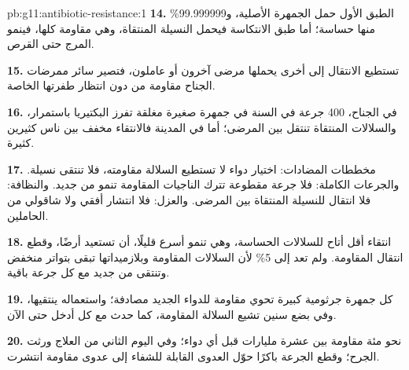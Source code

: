 \begin{solution}{pb:g11:antibiotic-resistance:1}
\textbf{14.} الطبق الأول حمل الجمهرة الأصلية، و99.999999\% منها حساسة؛
أما طبق الانتكاسة فيحمل النسيلة المنتقاة، وهي مقاومة كلها، فينمو المرج
حتى القرص.

\textbf{15.} تستطيع  الانتقال إلى  أخرى يحملها مرضى آخرون
أو عاملون، فتصير سائر ممرضات الجناح مقاومة من دون انتظار طفرتها
الخاصة.

\textbf{16.} في الجناح، 400 جرعة في السنة في جمهرة صغيرة مغلقة تفرز
البكتيريا باستمرار، والسلالات المنتقاة تنتقل بين المرضى؛ أما في المدينة
فالانتقاء مخفف بين ناس كثيرين  كثيرة.

\textbf{17.} مخططات المضادات: اختيار دواء لا تستطيع السلالة مقاومته،
فلا تنتقى نسيلة. والجرعات الكاملة: فلا جرعة مقطوعة تترك الناجيات
المقاومة تنمو من جديد. والنظافة: فلا انتقال للنسيلة المنتقاة بين
المرضى. والعزل: فلا انتشار أفقي ولا شاقولي من الحاملين.

\textbf{18.} انتقاء أقل أتاح للسلالات الحساسة، وهي تنمو أسرع قليلًا،
أن تستعيد أرضًا، وقطع انتقال المقاومة. ولم تعد إلى 5\% لأن السلالات
المقاومة وبلازميداتها تبقى بتواتر منخفض وتنتقى من جديد مع كل جرعة
باقية.

\textbf{19.} كل جمهرة جرثومية كبيرة تحوي  مقاومة للدواء الجديد
 مصادفة؛ واستعماله ينتقيها، وفي بضع سنين تشيع السلالة المقاومة،
كما حدث مع كل  أدخل حتى الآن.

\textbf{20.} نحو مئة  مقاومة بين عشرة مليارات قبل أي دواء؛ وفي
اليوم الثاني من العلاج ورثت الجرح؛ وقطع الجرعة باكرًا حوّل العدوى
القابلة للشفاء إلى عدوى مقاومة انتشرت.
\end{solution}
